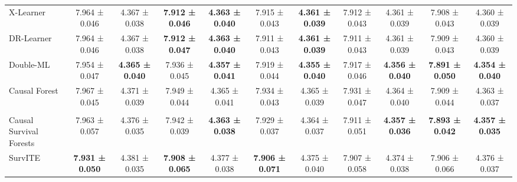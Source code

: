 \begin{table}[htbp]
{\begin{adjustbox}{angle=90,max height=0.95\textheight,center}
\begin{minipage}{\textheight}
\begin{adjustbox}{max width=\linewidth}
\begin{minipage}[c]{\linewidth}
\begin{adjustbox}{max width=\linewidth}
\begin{tabular}{l cc cc cc cc cc}
        X-Learner & 7.964 ± 0.046 & 4.367 ± 0.038 & \textbf{7.912 ± 0.046} & \textbf{4.363 ± 0.040} & 7.915 ± 0.043 & \textbf{4.361 ± 0.039} & 7.912 ± 0.043 & 4.361 ± 0.039 & 7.908 ± 0.043 & 4.360 ± 0.039 \\
        DR-Learner & 7.964 ± 0.046 & 4.367 ± 0.038 & \textbf{7.912 ± 0.047} & \textbf{4.363 ± 0.040} & 7.911 ± 0.043 & \textbf{4.361 ± 0.039} & 7.911 ± 0.043 & 4.361 ± 0.039 & 7.909 ± 0.043 & 4.360 ± 0.039 \\
        Double-ML & 7.954 ± 0.047 & \textbf{4.365 ± 0.040} & 7.936 ± 0.045 & \textbf{4.357 ± 0.041} & 7.919 ± 0.044 & \textbf{4.355 ± 0.040} & 7.917 ± 0.046 & \textbf{4.356 ± 0.040} & \textbf{7.891 ± 0.050} & \textbf{4.354 ± 0.040} \\
        Causal Forest & 7.967 ± 0.045 & 4.371 ± 0.039 & 7.949 ± 0.044 & 4.365 ± 0.041 & 7.934 ± 0.043 & 4.365 ± 0.039 & 7.931 ± 0.047 & 4.364 ± 0.040 & 7.909 ± 0.044 & 4.363 ± 0.037 \\ 
        \addlinespace
        \multicolumn{9}{l}{\textit{Direct-Survival CATE Methods}} \\
        Causal Survival Forests & 7.963 ± 0.057 & 4.376 ± 0.035 & 7.942 ± 0.039 & \textbf{4.363 ± 0.038} & 7.929 ± 0.037 & 4.364 ± 0.037 & 7.911 ± 0.051 & \textbf{4.357 ± 0.036} & \textbf{7.893 ± 0.042} & \textbf{4.357 ± 0.035} \\
        SurvITE & \textbf{7.931 ± 0.050} & 4.381 ± 0.035 & \textbf{7.908 ± 0.065} & 4.377 ± 0.038 & \textbf{7.906 ± 0.071} & 4.375 ± 0.040 & 7.907 ± 0.058 & 4.374 ± 0.038 & 7.906 ± 0.066 & 4.376 ± 0.037 \\


\end{tabular}
\end{adjustbox}
\end{minipage}
\end{adjustbox}
\end{minipage}
\end{adjustbox}}
\end{table}

